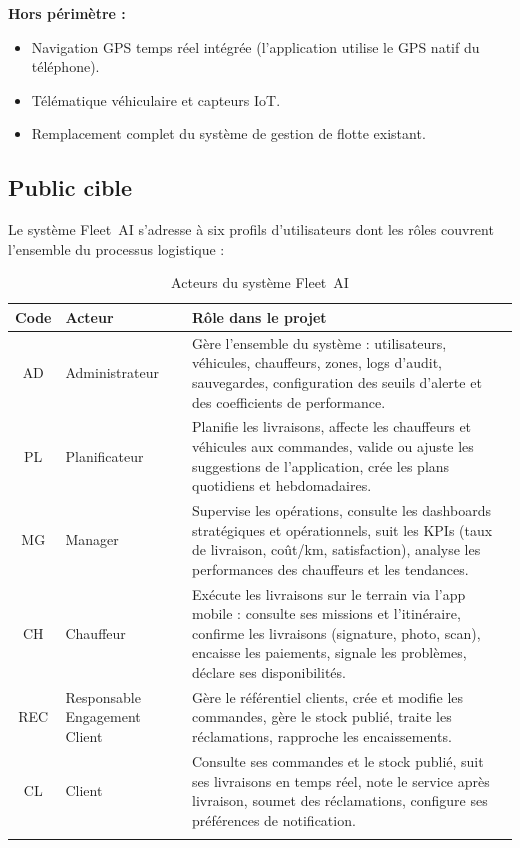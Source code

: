 \textbf{Hors périmètre :}
\begin{itemize}
    \item[$\bullet$] Navigation GPS temps réel intégrée (l'application utilise le GPS natif du téléphone).
    \item[$\bullet$] Télématique véhiculaire et capteurs IoT.
    \item[$\bullet$] Remplacement complet du système de gestion de flotte existant.
\end{itemize}

\subsection{Public cible}
Le système Fleet~AI s'adresse à six profils d'utilisateurs dont les rôles couvrent l'ensemble du processus logistique :

\setlength{\arrayrulewidth}{1pt}
\begin{longtable}{|c|>{\raggedright\arraybackslash}p{3cm}|>{\raggedright\arraybackslash}p{10cm}|}
\hline
\rowcolor{headerbg}
\textbf{Code} & \textbf{Acteur} & \textbf{Rôle dans le projet} \\
\hline
\endfirsthead
\endfoot
AD & Administrateur & Gère l'ensemble du système : utilisateurs, véhicules, chauffeurs, zones, logs d'audit, sauvegardes, configuration des seuils d'alerte et des coefficients de performance. \\
\hline
PL & Planificateur & Planifie les livraisons, affecte les chauffeurs et véhicules aux commandes, valide ou ajuste les suggestions de l'application, crée les plans quotidiens et hebdomadaires. \\
\hline
MG & Manager & Supervise les opérations, consulte les dashboards stratégiques et opérationnels, suit les KPIs (taux de livraison, coût/km, satisfaction), analyse les performances des chauffeurs et les tendances. \\
\hline
CH & Chauffeur & Exécute les livraisons sur le terrain via l'app mobile : consulte ses missions et l'itinéraire, confirme les livraisons (signature, photo, scan), encaisse les paiements, signale les problèmes, déclare ses disponibilités. \\
\hline
REC & Responsable Engagement Client & Gère le référentiel clients, crée et modifie les commandes, gère le stock publié, traite les réclamations, rapproche les encaissements. \\
\hline
CL & Client & Consulte ses commandes et le stock publié, suit ses livraisons en temps réel, note le service après livraison, soumet des réclamations, configure ses préférences de notification. \\
\hline
\caption{Acteurs du système Fleet~AI}
\end{longtable}
\setlength{\arrayrulewidth}{0.4pt}

